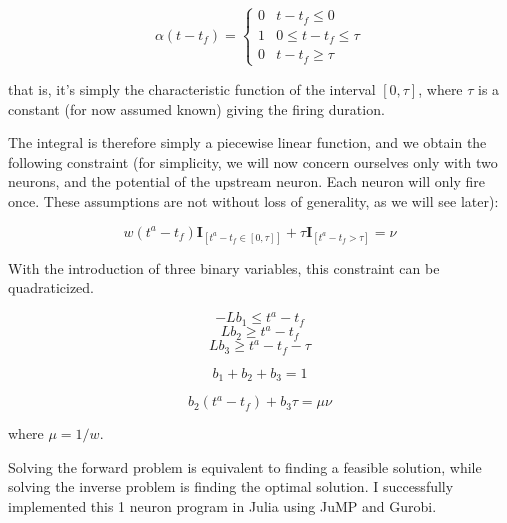 \documentclass[a4paper]{article}
\begin{document}
  \[ \alpha(t - t_f) =\begin{cases} 
      0 & t - t_f \leq 0 \\
      1 & 0 \leq t - t_f \leq \tau \\
      0 & t - t_f \geq \tau
   \end{cases}
\]

that is, it's simply the characteristic function of the interval $[0, \tau]$, where $\tau$ is a constant (for now assumed known) giving the firing duration.

The integral is therefore simply a piecewise linear function, and we obtain the following constraint (for simplicity, we will now concern ourselves only with two neurons, and the potential of the upstream neuron. Each neuron will only fire once. These assumptions are not without loss of generality, as we will see later):

\begin{equation}
    w (t^a - t_f) \mathbf{I}_{[t^a - t_f \in [0, \tau]]} + 
    \tau \mathbf{I}_{[t^a - t_f > \tau]} = \nu 
    \label{indconstr}
\end{equation}

With the introduction of three binary variables, this constraint can be quadraticized. 

\begin{equation}
    -L b_1 \leq t^a - t_f
    \label{bin1}
\end{equation}
\begin{equation}
    L b_2 \geq t^a - t_f
    \label{bin2}
\end{equation}
\begin{equation}
    L b_3 \geq t^a - t_f - \tau
    \label{bin3}
\end{equation}

\begin{equation}
    b_1 + b_2 + b_3 = 1
    \label{bintoto}
\end{equation}

\begin{equation}
    b_2 (t^a - t_f) + b_3 \tau  = \mu \nu  
    \label{quadconstr}
\end{equation}

where $\mu = 1/w$.

Solving the forward problem is equivalent to finding a feasible solution, while solving the inverse problem is finding the optimal solution. I successfully implemented this 1 neuron program in Julia using JuMP and Gurobi.
\end{document}
